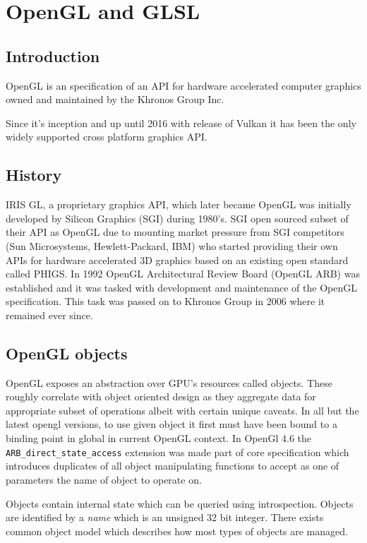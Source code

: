 \chapter{OpenGL and GLSL}

\section{Introduction}

OpenGL is an specification of an API for hardware accelerated computer graphics owned and maintained by the Khronos Group Inc.

Since it's inception  and up until 2016 with release of Vulkan it has been the only widely supported cross platform graphics API.

\section{History}

IRIS GL, a proprietary graphics API, which later became OpenGL was initially developed by Silicon Graphics (SGI) 
during 1980's. SGI open sourced subset of their API as OpenGL due to mounting market pressure from SGI competitors (Sun Microsystems, Hewlett-Packard, IBM) 
who started providing their own APIs for hardware accelerated 3D graphics based on an existing open standard called PHIGS.
In 1992 OpenGL Architectural Review Board (OpenGL ARB) was established and it was tasked with development and maintenance of the OpenGL specification. 
This task was passed on to Khronos Group in 2006 where it remained ever since.

\section{OpenGL objects}

OpenGL exposes an abstraction over GPU's resources called objects.
These roughly correlate with object oriented design as they aggregate data for appropriate subset of operations albeit with certain unique caveats.
In all but the latest opengl versions, to use given object it first must have been bound to a binding point in global in current OpenGL context.
In OpenGl 4.6 the \texttt{ARB\_direct\_state\_access} extension was made part of core specification which introduces duplicates of all object manipulating functions to 
accept as one of parameters the name of object to operate on.

Objects contain internal state which can be queried using introspection. 
Objects are identified by a \textit{name} which is an unsigned 32 bit integer. 
There exists common object model which describes how most types of objects are managed.

